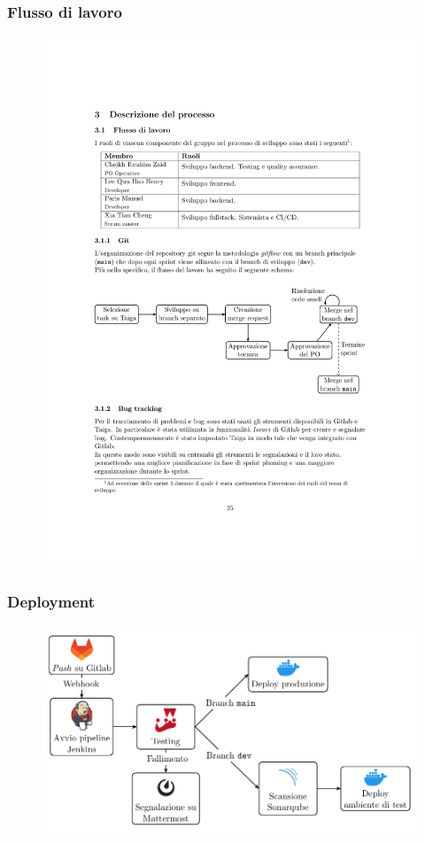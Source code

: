 \documentclass{beamer}
\begin{document}
\begin{frame}
  \frametitle{Flusso di lavoro}
  \begin{figure}[H]
      \centering
      \includegraphics[scale=0.65]{../img/slides/workflow.pdf}
  \end{figure}
\end{frame}


\begin{frame}
  \frametitle{Deployment}
  \begin{figure}[H]
      \centering
      \includegraphics[scale=0.65]{../img/slides/deployment.pdf}
  \end{figure}
\end{frame}
\end{document}

